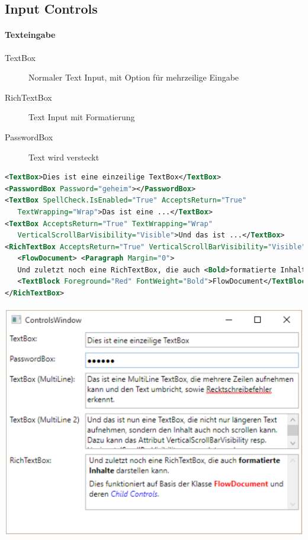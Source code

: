 \subsection{Input Controls}
\paragraph{Texteingabe}
\begin{description}
    \item[TextBox] Normaler Text Input, mit Option für mehrzeilige Eingabe
    \item[RichTextBox] Text Input mit Formatierung
    \item[PasswordBox] Text wird versteckt
\end{description}
\begin{lstlisting}[language=xml]
<TextBox>Dies ist eine einzeilige TextBox</TextBox> 
<PasswordBox Password="geheim"></PasswordBox> 
<TextBox SpellCheck.IsEnabled="True" AcceptsReturn="True" 
   TextWrapping="Wrap">Das ist eine ...</TextBox> 
<TextBox AcceptsReturn="True" TextWrapping="Wrap" 
   VerticalScrollBarVisibility="Visible">Und das ist ...</TextBox> 
<RichTextBox AcceptsReturn="True" VerticalScrollBarVisibility="Visible"> 
   <FlowDocument> <Paragraph Margin="0"> 
   Und zuletzt noch eine RichTextBox, die auch <Bold>formatierte Inhalte</Bold> darstellen kann. </Paragraph> <Paragraph Margin="0,5"> Dies funktioniert auf Basis der Klasse 
   <TextBlock Foreground="Red" FontWeight="Bold">FlowDocument</TextBlock> und deren <TextBlock Foreground="Blue" FontStyle="Italic">Child Controls</TextBlock>. </Paragraph> </FlowDocument>
</RichTextBox> 
\end{lstlisting}
\includegraphics[scale=0.4]{img/texteingabe.png}



